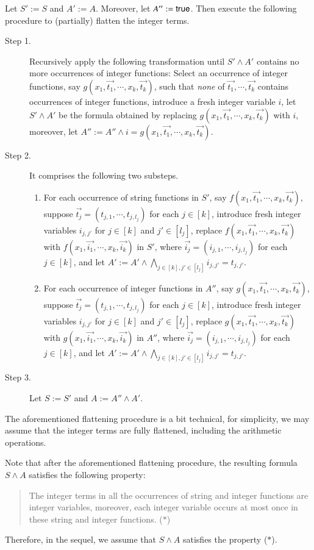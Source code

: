 {Let $S':=S$ and $A':=A$. Moreover, let $A'':= {\sf true}$. Then execute the following procedure to (partially) flatten the integer terms.
\begin{description}
\item[Step 1.] Recursively apply the following transformation until $S' \wedge A'$ contains no more occurrences of integer functions: Select an occurrence of integer functions, say $g(x_1, \vec{t_1}, \cdots, x_k, \vec{t_k})$, such that 
{\it none} of $\vec{t_1}, \cdots, \vec{t_k}$ contains occurrences of integer functions, introduce a fresh integer variable $i$, let $S' \wedge A'$ be the formula obtained by replacing $g(x_1, \vec{t_1}, \cdots, x_k, \vec{t_k})$ with $i$, moreover, let $A'':= A'' \wedge i = g(x_1, \vec{t_1}, \cdots, x_k, \vec{t_k})$.
%
\item[Step 2.] It comprises the following two substeps. 
\begin{enumerate}
\item For each occurrence of string functions in $S'$, say $f(x_1, \vec{t_1}, \cdots, x_k, \vec{t_k})$, suppose $\vec{t_j} = (t_{j,1}, \cdots, t_{j, l_j})$ for each $j \in [k]$, introduce fresh integer variables $i_{j, j'}$ for $j \in [k]$ and $j' \in [l_j]$, replace $f(x_1, \vec{t_1}, \cdots, x_k, \vec{t_k})$ with $f(x_1, \vec{i_1}, \cdots, x_k, \vec{i_k})$ in $S'$, where $\vec{i_j} = (i_{j,1}, \cdots, i_{j, l_j})$ for each $j \in [k]$, and let $A':=A' \wedge \bigwedge \limits_{j \in [k], j' \in [l_j]} i_{j, j'} = t_{j, j'}$. 
\item For each occurrence of integer functions in $A''$, say $g(x_1, \vec{t_1}, \cdots, x_k, \vec{t_k})$, suppose $\vec{t_j} = (t_{j,1}, \cdots, t_{j, l_j})$ for each $j \in [k]$, introduce fresh integer variables $i_{j, j'}$ for $j \in [k]$ and $j' \in [l_j]$, replace $g(x_1, \vec{t_1}, \cdots, x_k, \vec{t_k})$ with $g(x_1, \vec{i_1}, \cdots, x_k, \vec{i_k})$ in $A''$, where $\vec{i_j} = (i_{j,1}, \cdots, i_{j, l_j})$ for each $j \in [k]$, and let $A':=A' \wedge \bigwedge \limits_{j \in [k], j' \in [l_j]} i_{j, j'} = t_{j, j'}$. 
\end{enumerate}
%
\item[Step 3.] Let $S:=S'$ and $A:=A'' \wedge A' $.
\end{description}
The aforementioned flattening procedure is a bit technical, for simplicity, we may assume that the integer terms are fully flattened, including the arithmetic operations.

Note that after the aforementioned flattening procedure, the resulting formula $S \wedge A$ satisfies the following property: 
\begin{quote}
The integer terms in all the occurrences of string and integer functions  are integer variables, moreover, each integer variable occurs at most once in these string and integer functions.  \hfill ($*$)
\end{quote}
Therefore, in the sequel, we assume that $S \wedge A$ satisfies the property ($*$).

}
